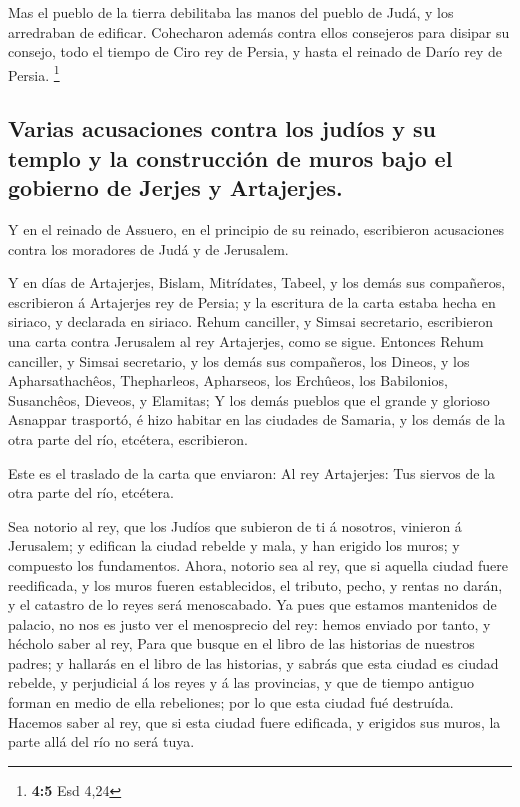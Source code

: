  Mas el pueblo de la tierra debilitaba las manos del
pueblo de Judá, y los arredraban de edificar.  Cohecharon
además contra ellos consejeros para disipar su consejo, todo el tiempo
de Ciro rey de Persia, y hasta el reinado de Darío rey de Persia.
\footnote{\textbf{4:5} Esd 4,24}

\hypertarget{varias-acusaciones-contra-los-juduxedos-y-su-templo-y-la-construcciuxf3n-de-muros-bajo-el-gobierno-de-jerjes-y-artajerjes.}{%
\subsection{Varias acusaciones contra los judíos y su templo y la
construcción de muros bajo el gobierno de Jerjes y
Artajerjes.}\label{varias-acusaciones-contra-los-juduxedos-y-su-templo-y-la-construcciuxf3n-de-muros-bajo-el-gobierno-de-jerjes-y-artajerjes.}}

 Y en el reinado de Assuero, en el principio de su
reinado, escribieron acusaciones contra los moradores de Judá y de
Jerusalem.

 Y en días de Artajerjes, Bislam, Mitrídates, Tabeel, y
los demás sus compañeros, escribieron á Artajerjes rey de Persia; y la
escritura de la carta estaba hecha en siriaco, y declarada en siriaco.
 Rehum canciller, y Simsai secretario, escribieron una
carta contra Jerusalem al rey Artajerjes, como se sigue. 
Entonces Rehum canciller, y Simsai secretario, y los demás sus
compañeros, los Dineos, y los Apharsathachêos, Thepharleos, Apharseos,
los Erchûeos, los Babilonios, Susanchêos, Dieveos, y Elamitas;
 Y los demás pueblos que el grande y glorioso Asnappar
trasportó, é hizo habitar en las ciudades de Samaria, y los demás de la
otra parte del río, etcétera, escribieron.

 Este es el traslado de la carta que enviaron: Al rey
Artajerjes: Tus siervos de la otra parte del río, etcétera.

 Sea notorio al rey, que los Judíos que subieron de ti á
nosotros, vinieron á Jerusalem; y edifican la ciudad rebelde y mala, y
han erigido los muros; y compuesto los fundamentos. 
Ahora, notorio sea al rey, que si aquella ciudad fuere reedificada, y
los muros fueren establecidos, el tributo, pecho, y rentas no darán, y
el catastro de lo reyes será menoscabado.  Ya pues que
estamos mantenidos de palacio, no nos es justo ver el menosprecio del
rey: hemos enviado por tanto, y hécholo saber al rey, 
Para que busque en el libro de las historias de nuestros padres; y
hallarás en el libro de las historias, y sabrás que esta ciudad es
ciudad rebelde, y perjudicial á los reyes y á las provincias, y que de
tiempo antiguo forman en medio de ella rebeliones; por lo que esta
ciudad fué destruída.  Hacemos saber al rey, que si esta
ciudad fuere edificada, y erigidos sus muros, la parte allá del río no
será tuya.

